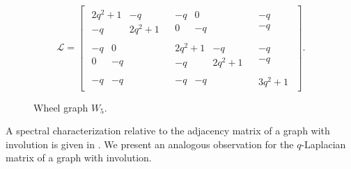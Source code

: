 \documentclass[12pt,a4paper]{article}
\begin{document}
\[
\mathscr{L} =
\left[
\begin{array}{c|c|c}
\begin{array}{cc} 2q^2+1 & -q \\ -q & 2q^2+1 \end{array} &
\begin{array}{cc} -q & 0 \\ 0 & -q \end{array} &
\begin{array}{c} -q \\ -q \end{array} \\
\hline
\begin{array}{cc} -q & 0 \\ 0 & -q \end{array} &
\begin{array}{cc} 2q^2+1 & -q \\ -q & 2q^2+1 \end{array} &
\begin{array}{c} -q \\ -q \end{array} \\
\hline
\begin{array}{cc} -q & -q \end{array} &
\begin{array}{cc} -q & -q \end{array} &
\begin{array}{c} 3q^2+1 \end{array}
\end{array}
\right].
\]
\begin{figure}
\centering
{}
\caption{Wheel graph $W_5.$}
\label{f1}
\end{figure}
A spectral characterization relative to the adjacency matrix of a graph with involution is given in \cite[Lemma 2]{kempton}. We present an analogous observation for the $q$-Laplacian matrix of a graph with involution.
\end{document}
